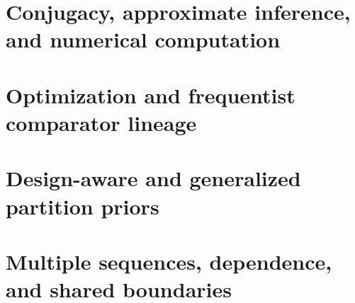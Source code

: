 \section{Conjugacy, approximate inference, and numerical computation}









\section{Optimization and frequentist comparator lineage}









\section{Design-aware and generalized partition priors}



\section{Multiple sequences, dependence, and shared boundaries}





